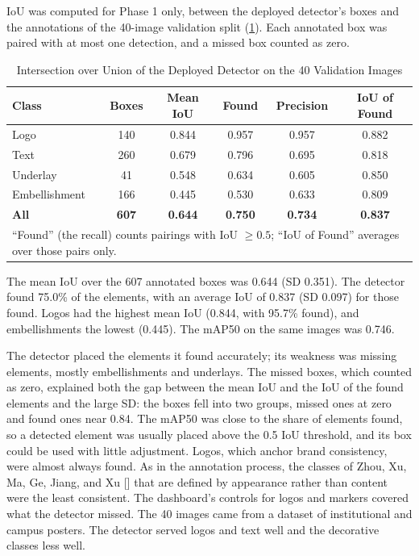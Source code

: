 \begin{refsection}
\clearpage
IoU was computed for Phase 1 only, between the deployed detector's boxes and the annotations of the 40-image validation split (\ref{tab:iou}). Each annotated box was paired with at most one detection, and a missed box counted as zero.

\begin{table}[!ht]
\centering
\caption{Intersection over Union of the Deployed Detector on the 40 Validation Images}
\label{tab:iou}
\begin{tabular}{l c c c c c}
\hline
\textbf{Class} & \textbf{Boxes} & \textbf{Mean IoU} & \textbf{Found} & \textbf{Precision} & \textbf{IoU of Found} \\ \hline
Logo & 140 & 0.844 & 0.957 & 0.957 & 0.882 \\
Text & 260 & 0.679 & 0.796 & 0.695 & 0.818 \\
Underlay & 41 & 0.548 & 0.634 & 0.605 & 0.850 \\
Embellishment & 166 & 0.445 & 0.530 & 0.633 & 0.809 \\ \hline
\textbf{All} & \textbf{607} & \textbf{0.644} & \textbf{0.750} & \textbf{0.734} & \textbf{0.837} \\ \hline
\multicolumn{6}{p{0.86\textwidth}}{\footnotesize ``Found'' (the recall) counts pairings with IoU $\geq 0.5$; ``IoU of Found'' averages over those pairs only.}
\end{tabular}
\end{table}

The mean IoU over the 607 annotated boxes was 0.644 (SD 0.351). The detector found 75.0\% of the elements, with an average IoU of 0.837 (SD 0.097) for those found. Logos had the highest mean IoU (0.844, with 95.7\% found), and embellishments the lowest (0.445). The mAP50 on the same images was 0.746.

The detector placed the elements it found accurately; its weakness was missing elements, mostly embellishments and underlays. The missed boxes, which counted as zero, explained both the gap between the mean IoU and the IoU of the found elements and the large SD: the boxes fell into two groups, missed ones at zero and found ones near 0.84. The mAP50 was close to the share of elements found, so a detected element was usually placed above the 0.5 IoU threshold, and its box could be used with little adjustment. Logos, which anchor brand consistency, were almost always found. As in the annotation process, the classes of Zhou, Xu, Ma, Ge, Jiang, and Xu [\citeyear{zhou2022cglgan}] that are defined by appearance rather than content were the least consistent. The dashboard's controls for logos and markers covered what the detector missed. The 40 images came from a dataset of institutional and campus posters. The detector served logos and text well and the decorative classes less well.


\end{refsection}
